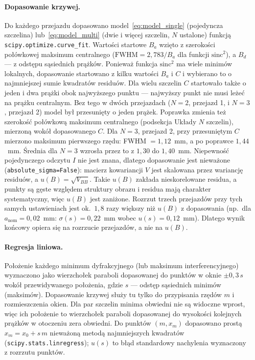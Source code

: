 \documentclass[12pt, a4paper]{article}
\begin{document}
\paragraph{Dopasowanie krzywej.} Do każdego przejazdu dopasowano model~\eqref{eq:model_single}
(pojedyncza szczelina) lub~\eqref{eq:model_multi} (dwie i więcej szczelin, $N$ ustalone) funkcją
\texttt{scipy.optimize.curve\_fit}. Wartości startowe $B_a$ wzięto z szerokości połówkowej
maksimum centralnego ($\mathrm{FWHM} = 2{,}783/B_a$ dla funkcji $\mathrm{sinc}^2$), a $B_d$ ---
z odstępu sąsiednich prążków. Ponieważ funkcja $\mathrm{sinc}^2$ ma wiele minimów lokalnych,
dopasowanie startowano z kilku wartości $B_a$ i $C$ i wybierano to o najmniejszej sumie
kwadratów residuów. Dla wielu szczelin $C$ startowało także o jeden i dwa prążki obok
najwyższego punktu --- najwyższy punkt nie musi leżeć na prążku centralnym. Bez tego w dwóch
przejazdach ($N = 2$, przejazd 1, i $N = 3$, przejazd 2) model był przesunięty o jeden prążek.
Poprawka zmienia też szerokość połówkową maksimum centralnego (podsekcja Układy $N$ szczelin),
mierzoną wokół dopasowanego $C$. Dla $N = 3$, przejazd 2, przy przesuniętym $C$ mierzono
maksimum pierwszego rzędu: FWHM $= 1{,}12$~mm, a po poprawce $1{,}44$~mm. Średnia dla $N = 3$
wzrosła przez to z $1{,}30$ do $1{,}40$~mm. Niepewność pojedynczego odczytu
$I$ nie jest znana, dlatego dopasowanie jest nieważone (\texttt{absolute\_sigma=False}):
macierz kowariancji $V$ jest skalowana przez wariancję residuów, a $u(B) = \sqrt{V_{BB}}$.
Takie $u(B)$ zakłada nieskorelowane residua, a punkty są gęste względem struktury obrazu
i residua mają charakter systematyczny, więc $u(B)$ jest zaniżone. Rozrzut trzech
przejazdów przy tych samych ustawieniach jest ok.\ $1{,}8$ razy większy niż $u(B)$
z dopasowania (np.\ dla $a_\text{nom} = 0{,}02$~mm: $\sigma(s) = 0{,}22$~mm wobec
$u(s) = 0{,}12$~mm). Dlatego wynik końcowy opiera się na rozrzucie przejazdów, a nie na $u(B)$.

\paragraph{Regresja liniowa.} Położenie każdego minimum dyfrakcyjnego (lub maksimum
interferencyjnego) wyznaczono jako wierzchołek paraboli dopasowanej do punktów w oknie
$\pm0{,}3\,s$ wokół przewidywanego położenia, gdzie $s$ --- odstęp sąsiednich minimów (maksimów).
Dopasowanie krzywej służy tu tylko do przypisania rzędów $m$ i rozmieszczenia okien. Dla par
szczelin minima obwiedni nie są widoczne wprost, więc ich położenie to wierzchołek paraboli
dopasowanej do wysokości kolejnych prążków w otoczeniu zera obwiedni. Do punktów $(m, x_m)$
dopasowano prostą $x_m = x_0 + s\,m$ nieważoną metodą najmniejszych kwadratów
(\texttt{scipy.stats.linregress}); $u(s)$ to błąd standardowy nachylenia wyznaczony
z rozrzutu punktów.
\end{document}
